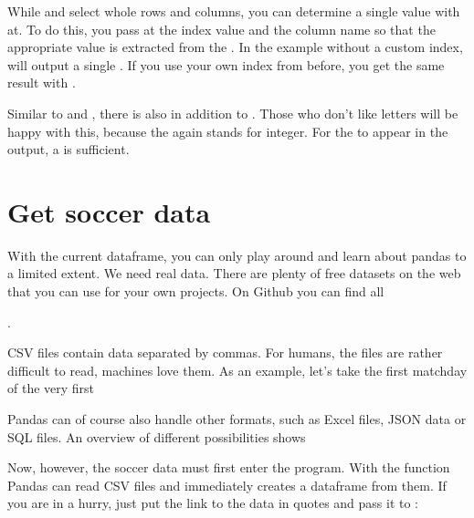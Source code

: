 While  and  select whole rows and columns, you can determine a single value with at. To do this, you pass at the index value and the column name so that the appropriate value is extracted from the . In the example without a custom index,  will output a single . If you use your own index from before, you get the same result with .

Similar to  and , there is also  in addition to . Those who don't like letters will be happy with this, because the  again stands for integer. For the  to appear in the output, a  is sufficient.



\section{Get soccer data}


With the current dataframe, you can only play around and learn about pandas to a limited extent. We need real data. There are plenty of free datasets on the web that you can use for your own projects. On Github you can find all

.

CSV files contain data separated by commas. For humans, the files are rather difficult to read, machines love them. As an example, let's take the first matchday of the very first 


Pandas can of course also handle other formats, such as Excel files, JSON data or SQL files. An overview of different possibilities shows 

Now, however, the soccer data must first enter the program. With the function  Pandas can read CSV files and immediately creates a dataframe from them. If you are in a hurry, just put the link to the data in quotes and pass it to :

\medskip


